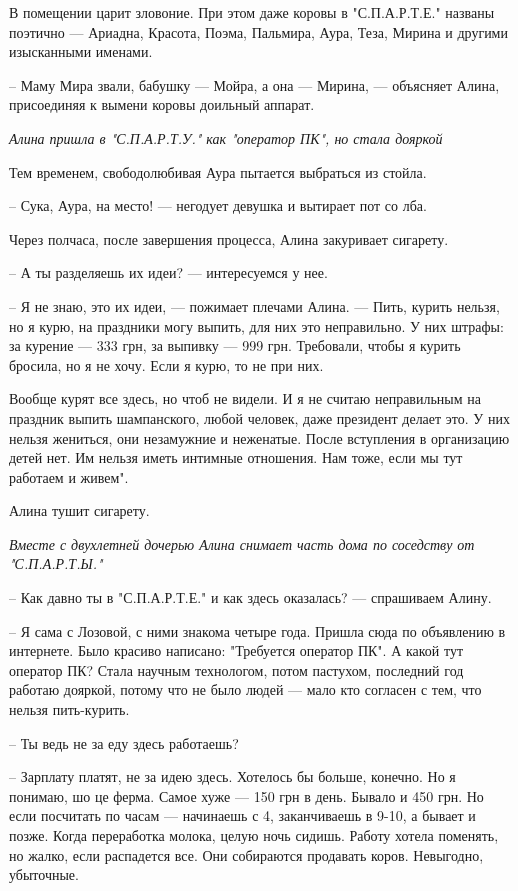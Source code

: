 В помещении царит зловоние. При этом даже коровы в "С.П.А.Р.Т.Е." названы
поэтично --- Ариадна, Красота, Поэма, Пальмира, Аура, Теза, Мирина и другими
изысканными именами.

– Маму Мира звали, бабушку --- Мойра, а она --- Мирина, --- объясняет Алина,
присоединяя к вымени коровы доильный аппарат.

\emph{Алина пришла в "С.П.А.Р.Т.У." как "оператор ПК", но стала дояркой}

Тем временем, свободолюбивая Аура пытается выбраться из стойла.

– Сука, Аура, на место! --- негодует девушка и вытирает пот со лба.

Через полчаса, после завершения процесса, Алина закуривает сигарету.

– А ты разделяешь их идеи? --- интересуемся у нее.

– Я не знаю, это их идеи, --- пожимает плечами Алина. --- Пить, курить нельзя, но я
курю, на праздники могу выпить, для них это неправильно. У них штрафы: за
курение --- 333 грн, за выпивку --- 999 грн. Требовали, чтобы я курить бросила, но
я не хочу. Если я курю, то не при них. 

Вообще курят все здесь, но чтоб не видели. И я не считаю неправильным на
праздник выпить шампанского, любой человек, даже президент делает это. У них
нельзя жениться, они незамужние и неженатые. После вступления в организацию
детей нет. Им нельзя иметь интимные отношения. Нам тоже, если мы тут работаем и
живем".

Алина тушит сигарету.

\emph{Вместе с двухлетней дочерью Алина снимает часть дома по соседству от "С.П.А.Р.Т.Ы."}

– Как давно ты в "С.П.А.Р.Т.Е." и как здесь оказалась? --- спрашиваем Алину.

– Я сама с Лозовой, с ними знакома четыре года. Пришла сюда по объявлению в
интернете. Было красиво написано: "Требуется оператор ПК". А какой тут оператор
ПК? Стала научным технологом, потом пастухом, последний год работаю дояркой,
потому что не было людей --- мало кто согласен с тем, что нельзя пить-курить.

– Ты ведь не за еду здесь работаешь?

– Зарплату платят, не за идею здесь. Хотелось бы больше, конечно. Но я понимаю,
шо це ферма. Самое хуже --- 150 грн в день. Бывало и 450 грн. Но если посчитать
по часам --- начинаешь с 4, заканчиваешь в 9-10, а бывает и позже. Когда
переработка молока, целую ночь сидишь. Работу хотела поменять, но жалко, если
распадется все. Они собираются продавать коров. Невыгодно, убыточные.

